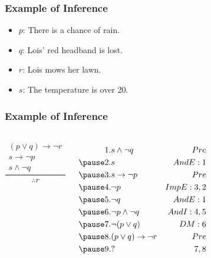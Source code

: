 \documentclass[dvipsnames]{beamer}
\begin{document}
\begin{frame}
  \frametitle{Example of Inference}

  \begin{example}
    \begin{itemize}
      \item $p$: There is a chance of rain.
      \item $q$: Lois' red headband is lost.
      \item $r$: Lois mows her lawn.
      \item $s$: The temperature is over 20.
    \end{itemize}
  \end{example}
\end{frame}

\begin{frame}
  \frametitle{Example of Inference}

  \begin{example}
    \begin{columns}
      \[
      \frac
        {
          \begin{array}{c}
            (p \vee q) \rightarrow \neg r\\
            s \rightarrow \neg p\\
            s \wedge \neg q
          \end{array}
        }
        {
          \therefore r
        }
      \]

      \pause
      \begin{eqnarray*}
        1. & s \wedge \neg q                & Pre\\
        \pause
        2. & s                              & AndE:1\\
        \pause
        3. & s \rightarrow \neg p           & Pre\\
        \pause
        4. & \neg p                         & ImpE:3,2\\
        \pause
        5. & \neg q                         & AndE:1\\
        \pause
        6. & \neg p \wedge \neg q           & AndI:4,5\\
        \pause
        7. & \neg (p \vee q)                & DM:6\\
        \pause
        8. & (p \vee q) \rightarrow \neg r  & Pre\\
        \pause
        9. & ?                              & 7,8
      \end{eqnarray*}
    \end{columns}
  \end{example}
\end{frame}
\end{document}
